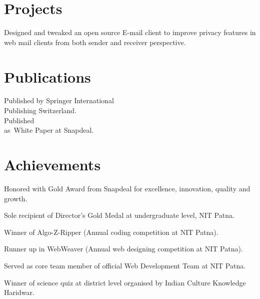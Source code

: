 \documentclass[]{rajnikant-resume-openfont}
\begin{document}
\begin{minipage}[t]{0.66\textwidth}

\section{Projects}
Designed and tweaked an open source E-mail client to improve privacy features in web mail clients from both sender and receiver perspective.
\sectionsep


\section{Publications}
\textbullet{}  \href{https://rd.springer.com/chapter/10.1007/978-3-319-32467-8_118}{ } Published by Springer International \\ \hspace{9pt}Publishing Switzerland. \\
\textbullet{}   Published \\ \hspace{8pt} as White Paper at Snapdeal.
\sectionsep


\section{Achievements} 
\sectionsep
\begin{tightemize}
	\item  Honored with Gold Award from Snapdeal for excellence, innovation, quality and growth.
	\item Sole recipient of Director's Gold Medal at undergraduate level, NIT Patna.
	\item Winner of Algo-Z-Ripper (Annual coding competition at NIT Patna).
	\item Runner up in WebWeaver (Annual web designing competition at NIT Patna).
	\item Served as core team member of official Web Development Team at NIT Patna.
	\item Winner of science quiz at district level organised by Indian Culture Knowledge Haridwar.
\end{tightemize}
\sectionsep



\end{minipage} 
\end{document}

